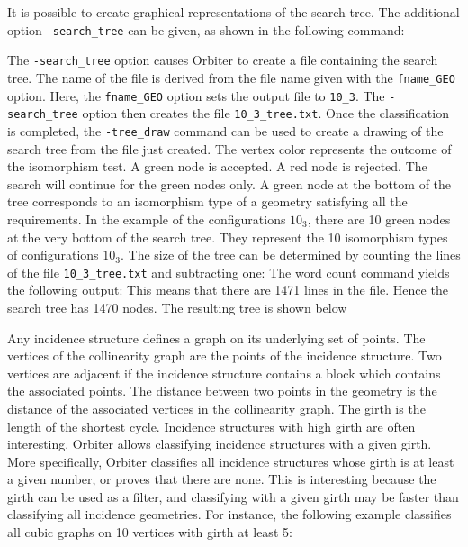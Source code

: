 \bigskip

It is possible to create graphical representations of the search tree. 
The additional option \verb'-search_tree' can be given, as shown in the following command:


The \verb'-search_tree' option causes Orbiter 
to create a file containing the search tree. 
The name of the file is derived from the file name given with the \verb'fname_GEO' option. 
Here, the \verb'fname_GEO' option sets the output file to \verb'10_3'. The \verb'-search_tree'
option then creates the file \verb'10_3_tree.txt'.
Once the classification is completed,
the \verb'-tree_draw' command can be used to create 
a drawing of the search tree from the file just created.
The vertex color represents the outcome of the isomorphism test. 
A green node is accepted. A red node is rejected. 
The search will continue for the green nodes only. 
A green node at the bottom of the tree corresponds 
to an isomorphism type of a geometry satisfying all the requirements. 
In the example of the configurations $10_3$, there are 10 green nodes at the very bottom 
of the search tree. 
They represent the 10 isomorphism types of configurations $10_3$.
The size of the tree can be determined by counting 
the lines of the file \verb'10_3_tree.txt' and subtracting one:
The word count command yields the following output:
This means that there are 1471 lines in the file. 
Hence the search tree has 1470 nodes.
The resulting tree is shown below


\bigskip


Any incidence structure defines a graph on its underlying set of points. 
The vertices of the collinearity graph are the points of the incidence structure.
Two vertices are adjacent if the incidence structure contains a block 
which contains the associated points. 
The distance between two points in the geometry 
is the distance of the associated vertices in the collinearity graph. 
The girth is the length of the shortest cycle. 
Incidence structures with high girth are often interesting.
Orbiter allows classifying incidence structures with a given girth.
More specifically, Orbiter classifies 
all incidence structures whose girth is at least a given number, 
or proves that there are none.
This is interesting because the girth can be used as a filter, 
and classifying with a given girth may be 
faster than classifying all incidence geometries.
For instance, 
the following example classifies 
all cubic graphs on 10 vertices with girth at least 5:


